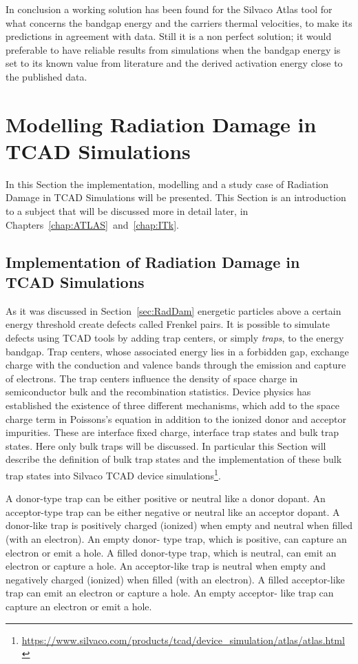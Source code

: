 In conclusion a working solution has been found for the Silvaco Atlas tool  for what concerns the bandgap 
energy and the carriers thermal velocities, to make its predictions in agreement with data. 
Still it is a non perfect solution; it would preferable to have reliable results from simulations
 when the bandgap energy is set to its known value from literature and the derived activation energy close 
 to the published data.


\section{Modelling Radiation Damage in TCAD Simulations}
\label{sec:TCADRadDamage}

In this Section the implementation, modelling and a  study case of Radiation Damage in TCAD 
Simulations will be presented. This Section is an introduction to a subject that will be 
discussed more in detail later, in Chapters~\ref{chap:ATLAS}~and~\ref{chap:ITk}.

\subsection{Implementation of Radiation Damage in TCAD Simulations}
As it was discussed in Section~\ref{sec:RadDam} energetic particles above a certain energy threshold 
create defects called Frenkel pairs. 
It is possible to simulate defects using TCAD tools by adding trap centers, or simply {\it traps}, to the 
energy bandgap. 
Trap centers, whose associated energy lies in a forbidden gap, exchange charge with the conduction 
and valence bands through the emission and capture of electrons. The trap centers influence the 
density of space charge in semiconductor bulk and the recombination statistics.
Device physics has established the existence of three different mechanisms, which add to the space 
charge term in Poissons's equation in addition to the ionized donor and acceptor impurities. These are 
interface fixed charge, interface trap states and bulk trap states. Here only bulk traps 
will be discussed. In particular this Section will describe the definition of bulk trap states and the implementation of these bulk trap states into Silvaco TCAD device simulations\footnote{\url{https://www.silvaco.com/products/tcad/device_simulation/atlas/atlas.html}}.

A donor-type trap can be either positive or neutral like a donor dopant. An acceptor-type trap can be 
either negative or neutral like an acceptor dopant. A donor-like trap is positively charged (ionized) when 
empty and neutral when filled (with an electron). An empty donor- type trap, which is positive, can 
capture an electron or emit a hole. A filled donor-type trap, which is neutral, can emit an electron or 
capture a hole. An acceptor-like trap is neutral when empty and negatively charged (ionized) when filled 
(with an electron). A filled acceptor-like trap can emit an electron or capture a hole. An empty acceptor-
like trap can capture an electron or emit a hole. 

